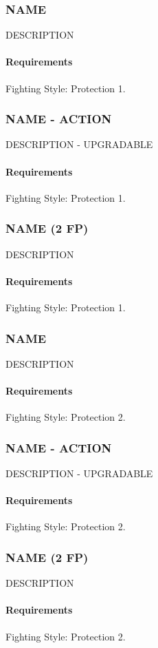 \subsubsection{NAME} \label{feat::name}
    DESCRIPTION
    \paragraph{Requirements} Fighting Style: Protection 1.
\subsubsection{NAME - ACTION} \label{feat::name}
    DESCRIPTION - UPGRADABLE
    \paragraph{Requirements} Fighting Style: Protection 1.
\subsubsection{NAME (2 FP)} \label{feat::name}
    DESCRIPTION
    \paragraph{Requirements} Fighting Style: Protection 1.
\subsubsection{NAME} \label{feat::name}
    DESCRIPTION
    \paragraph{Requirements} Fighting Style: Protection 2.
\subsubsection{NAME - ACTION} \label{feat::name}
    DESCRIPTION - UPGRADABLE
    \paragraph{Requirements} Fighting Style: Protection 2.
\subsubsection{NAME (2 FP)} \label{feat::name}
    DESCRIPTION
    \paragraph{Requirements} Fighting Style: Protection 2.
